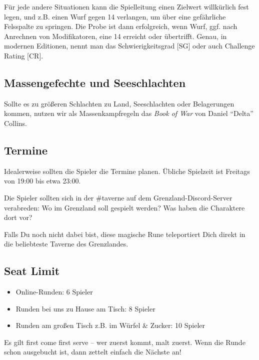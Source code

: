 \documentclass[11pt]{wbzine}
\begin{document}
\begin{multicols}{2}
    Für jede andere Situationen kann die Spielleitung einen Zielwert
willkürlich fest legen, und z.B. einen Wurf gegen 14 verlangen, um über eine
gefährliche Felsspalte zu springen. Die Probe ist dann erfolgreich, wenn Wurf,
ggf. nach Anrechnen von Modifikatoren, eine 14 erreicht oder übertrifft.
Genau, in modernen Editionen, nennt man das Schwierigkeitsgrad [SG] oder auch
Challenge Rating [CR].
    

    \subsection{Massengefechte und Seeschlachten}

    Sollte es zu größeren Schlachten zu Land, Seeschlachten oder
    Belagerungen kommen, nutzen wir als Massenkampfregeln das
    \textit{Book of War} von Daniel ``Delta'' Collins.

\subsection{Termine}

    Idealerweise sollten die Spieler die Termine planen.
    Übliche Spielzeit ist Freitags von 19:00 bis etwa 23:00.

Die Spieler sollten sich in der \#taverne auf dem Grenzland-Discord-Server verabreden:
Wo im Grenzland soll gespielt werden? Was haben die Charaktere dort vor?

Falls Du noch nicht dabei bist, diese magische Rune teleportiert
Dich direkt in die beliebteste Taverne des Grenzlandes.


\subsection{Seat Limit}

\begin{itemize}
    \item Online-Runden: 6 Spieler
    \item Runden bei uns zu Hause am Tisch: 8 Spieler
    \item Runden am großen Tisch z.B. im Würfel \& Zucker: 10 Spieler
\end{itemize}

Es gilt first come first serve – wer zuerst kommt, malt zuerst. Wenn die Runde
schon ausgebucht ist, dann zettelt einfach die Nächste an!




\end{multicols}
\end{document}
